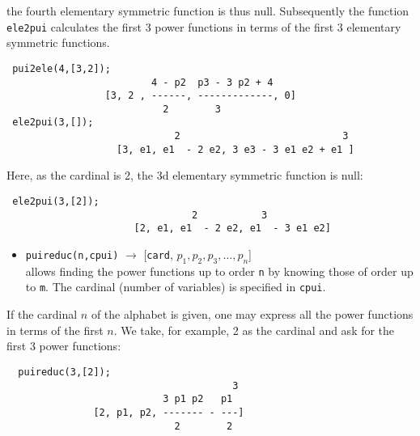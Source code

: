 \documentclass[11pt]{article}
\begin{document}
the fourth elementary symmetric function is thus null.  Subsequently the
function \texttt{ele2pui} calculates the first 3 power functions in terms of the
first 3 elementary symmetric functions.
\small
\begin{verbatim}
 pui2ele(4,[3,2]);
                         4 - p2  p3 - 3 p2 + 4
                 [3, 2 , ------, -------------, 0]
                           2        3   
 ele2pui(3,[]);
                             2                            3
                   [3, e1, e1  - 2 e2, 3 e3 - 3 e1 e2 + e1 ]
\end{verbatim}
\normalsize
Here, as the cardinal is 2, the 3d elementary symmetric function is null:
\small
\begin{verbatim}
 ele2pui(3,[2]);
                                2           3
                      [2, e1, e1  - 2 e2, e1  - 3 e1 e2]
\end{verbatim}
\normalsize
\begin{itemize}
  \item \texttt{puireduc(n,cpui)} 
      $\longrightarrow$ [\texttt{card}, $p_1,p_2,p_3,\dots,p_n$] \\ 
    allows finding the power functions up to order \texttt{n} by knowing those
    of order up to \texttt{m}.  The cardinal (number of variables) is specified
    in \texttt{cpui}.
\end{itemize}
If the cardinal $n$ of the alphabet is given, one may express all the power
functions in terms of the first $n$.  We take, for example, 2 as the cardinal
and ask for the first 3 power functions:
\small
\begin{verbatim}
  puireduc(3,[2]);
                                       3
                           3 p1 p2   p1
               [2, p1, p2, ------- - ---]
                             2        2
\end{verbatim}
\normalsize
\end{document}
